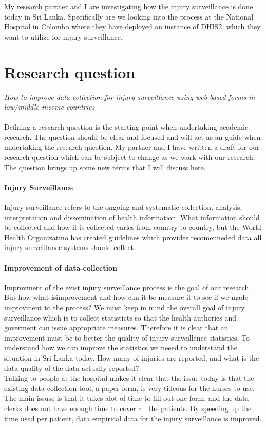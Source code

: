 \documentclass[UKenglish, 12pt]{article}
\begin{document}
My research partner and I are investigating how the injury surveillance is done today in Sri Lanka. Specifically are we looking into the process at the National Hospital in Colombo where they have deployed an instance of DHIS2, which they want to utilize for injury surveillance.


\section*{Research question}

\emph{How to improve data-collection for injury surveillance using web-based forms in low/middle income countries}
\\ \\
Defining a research question is the starting point when undertaking academic research. The question should be clear and focused and will act as an guide when undertaking the research question. My partner and I have written a draft for our research question which can be subject to change as we work with our research. The question brings up some new terms that I will discuss here.

\paragraph*{Injury Surveillance}
Injury surveillance refers to the ongoing and systematic collection, analysis, interpretation and dissemination of health information\cite{who-guide}. What information should be collected and how it is collected varies from country to country, but the World Health Organizatino has created guidelines which provides recomenneded data all injury surveillance systems should collect.
\paragraph*{Improvement of data-collection} 
Improvment of the exist injury surveillance process is the goal of our research. But how what isimprovement and how can it be measure it to see if we made improvment to the process? We must keep in mind the overall goal of injury surveillance which is to collect statisticts so that the health authories and goverment can issue appropriate measures. Therefore it is clear that an improvement must be to better the quality of injury surveillence statistics. To understand how we can improve the statistics we neeed to understand the situation in Sri Lanka today. How many of injuries are reported, and what is the data quality of the data actually reported? \\
Talking to people at the hospital makes it clear that the issue today is that the existing data-collection tool, a paper form, is very tideous for the nurses to use. The main issuse is that it takes alot of time to fill out one form, and the data clerks does not have enough time to cover all the patients. By speeding up the time used per patient, data empirical data for the injury surveillance is improved.
\end{document}

